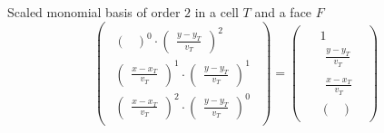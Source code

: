 \begin{exemplebox}{Scaled monomial basis of order $2$ in a cell $T$ and a face $F$}
\begin{equation}
\begin{pmatrix}
\begin{aligned}
\begin{pmatrix}
                        \end{pmatrix}^0
                        \cdot
                        \begin{pmatrix}
                            \displaystyle
                            \frac{y - y_T}{v_T}
                        \end{pmatrix}^2
                        \\
                        \begin{pmatrix}
                            \displaystyle
                            \frac{x - x_T}{v_T}
                        \end{pmatrix}^1
                        \cdot
                        \begin{pmatrix}
                            \displaystyle
                            \frac{y - y_T}{v_T}
                        \end{pmatrix}^1
                        \\
                        \begin{pmatrix}
                            \displaystyle
                            \frac{x - x_T}{v_T}
                        \end{pmatrix}^2
                        \cdot
                        \begin{pmatrix}
                            \displaystyle
                            \frac{y - y_T}{v_T}
                        \end{pmatrix}^0
                    \end{aligned}
                \end{pmatrix}
                =
                \begin{pmatrix}
                    \begin{aligned}
                        & 1
                        \\
                        & \begin{matrix}
                            \displaystyle
                            \frac{y - y_T}{v_T}
                        \end{matrix}
                        \\
                        & \begin{matrix}
                            \displaystyle
                            \frac{x - x_T}{v_T}
                        \end{matrix}
                        \\
                        & \begin{pmatrix}

\end{pmatrix}
\end{aligned}
\end{pmatrix}
\end{equation}
\end{exemplebox}

